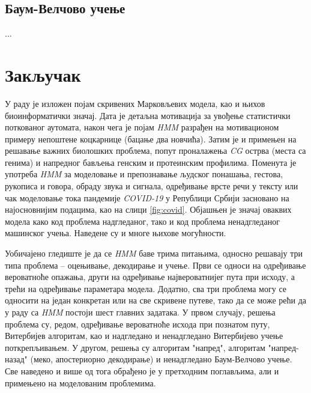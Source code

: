 \documentclass[12pt,oneside]{memoir}
\begin{document}
\begin{CJK}{UTF8}{ipxm}
\section{Баум-Велчово учење}
...


\chapter{Закључак}
У раду је изложен појам скривених Марковљевих модела, као и њихов биоинформатички значај. Дата је детаљна мотивација за увођење статистички поткованог аутомата, након чега је појам \textit{HMM} разрађен на мотивационом примеру непоштене коцкарнице (бацање два новчића). Затим је и примењен на решавање важних биолошких проблема, попут проналажења \textit{CG} острва (места са генима) и напредног бављења генским и протеинским профилима. Поменута је употреба \textit{HMM} за моделовање и препознавање људског понашања, гестова, рукописа и говора, обраду звука и сигнала, одређивање врсте речи у тексту или чак моделовање тока пандемије \textit{COVID-19} у Републици Србији засновано на најосновнијим подацима, као на слици \ref{fig:covid}. Објашњен је значај оваквих модела како код проблема надгледаног, тако и код проблема ненадгледаног машинског учења. Наведене су и многе њихове могућности.

Уобичајено гледиште је да се \textit{HMM} баве трима питањима, односно решавају три типа проблема -- оцењивање, декодирање и учење\cite{rabiner1989}. Први се односи на одређивање вероватноће опажања, други на одређивање највероватнијег пута при исходу, а трећи на одређивање параметара модела. Додатно, сва три проблема могу се односити на један конкретан или на све скривене путеве, тако да се може рећи да у раду са \textit{HMM} постоји шест главних задатака\cite{kelliss2021}. У првом случају, решења проблема су, редом, одређивање вероватноће исхода при познатом путу, Витербијев алгоритам, као и надгледано и ненадгледано Витербијево учење поткрепљивањем. У другом, решења су алгоритам "напред", алгоритам "напред-назад" (меко, апостериорно декодирање) и ненадгледано Баум-Велчово учење. Све наведено и више од тога обрађено је у претходним поглављима, али и примењено на моделованим проблемима.


\end{CJK}
\end{document}
